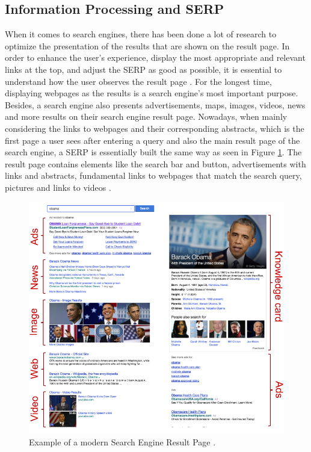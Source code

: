 \subsection{Information Processing and SERP}
\label{subsection:ReadingSERP}
When it comes to search engines, there has been done a lot of research to optimize the presentation of the results that are shown on the result page.  In order to enhance the user's experience, display the most appropriate and relevant links at the top, and adjust the SERP as good as possible, it is essential to understand how the user observes the result page \autocite{buscher2010good, liu2015influence}.
For the longest time, displaying webpages as the results is a search engine's most important purpose. Besides, a search engine also presents advertisements, maps, images, videos, news and more results on their search engine result page. Nowadays, when mainly considering the links to webpages and their corresponding abstracts, which is the first page a user sees after entering a query and also the main result page of the search engine, a SERP is essentially built the same way as seen in Figure \ref{figure:ModernSerp}.
The result page contains elements like the search bar and button, advertisements with links and abstracts, fundamental links to webpages that match the search query, pictures and links to videos \autocite{wang2016beyond}.

\begin{figure}[!ht]
    \centering
    \includegraphics[width=0.75\linewidth]{images/SERP_wang2016beyond.png}
    \caption{
        Example of a modern Search Engine Result Page \autocite[104]{wang2016beyond}.
    }
    \label{figure:ModernSerp}
\end{figure}

